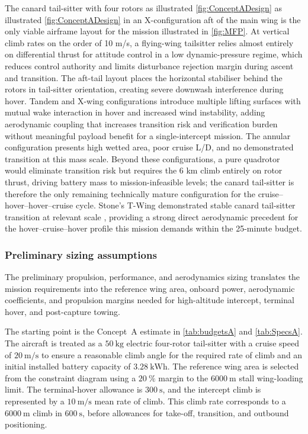 The canard tail-sitter with four rotors as illustrated \autoref{fig:ConceptADesign} as illustrated \autoref{fig:ConceptADesign} in an X-configuration aft of the main wing is the only viable airframe layout for the mission illustrated in \autoref{fig:MFP}. At vertical climb rates on the order of 10 m/s, a flying-wing tailsitter relies almost entirely on differential thrust for attitude control in a low dynamic-pressure regime, which reduces control authority and limits disturbance rejection margin during ascent and transition. The aft-tail layout places the horizontal stabiliser behind the rotors in tail-sitter orientation, creating severe downwash interference during hover. Tandem and X-wing configurations introduce multiple lifting surfaces with mutual wake interaction in hover and increased wind instability, adding aerodynamic coupling that increases transition risk and verification burden without meaningful payload benefit for a single-intercept mission. The annular configuration presents high wetted area, poor cruise L/D, and no demonstrated transition at this mass scale. Beyond these configurations, a pure quadrotor would eliminate transition risk but requires the 6 km climb entirely on rotor thrust, driving battery mass to mission-infeasible levels; the canard tail-sitter is therefore the only remaining technically mature configuration for the cruise–hover–hover–cruise cycle. Stone's T-Wing demonstrated stable canard tail-sitter transition at relevant scale \cite{Stone2008TWing}, providing a strong direct aerodynamic precedent for the hover–cruise–hover profile this mission demands within the 25-minute budget.











\subsubsection{Preliminary sizing assumptions}
 
The preliminary propulsion, performance, and aerodynamics sizing translates the mission requirements into the reference wing area, onboard power, aerodynamic coefficients, and propulsion margins needed for high-altitude intercept, terminal hover, and post-capture towing.
 
The starting point is the Concept~A estimate in \autoref{tab:budgetsA} and \autoref{tab:SpecsA}. The aircraft is treated as a \(50~\mathrm{kg}\) electric four-rotor tail-sitter with a cruise speed of \(20~\mathrm{m/s}\) to ensure a reasonable climb angle for the required rate of climb and an initial
installed battery capacity of \(3.28~\mathrm{kWh}\). The reference wing area is
selected from the constraint diagram using a \(20~\%\) margin to the
\(6000~\mathrm{m}\) stall wing-loading limit. The terminal-hover allowance is
\(300~\mathrm{s}\), and the intercept climb is represented by a
\(10~\mathrm{m/s}\) mean rate of climb. This climb rate corresponds to a
\(6000~\mathrm{m}\) climb in \(600~\mathrm{s}\), before allowances for
take-off, transition, and outbound positioning.
 
